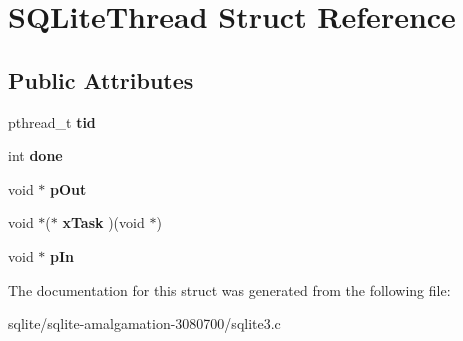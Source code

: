 \hypertarget{struct_s_q_lite_thread}{\section{S\+Q\+Lite\+Thread Struct Reference}
\label{struct_s_q_lite_thread}
}
\subsection*{Public Attributes}
\begin{DoxyCompactItemize}
\item 
\hypertarget{struct_s_q_lite_thread_a344b7b30ad7f54c6cbfb4d2378982610}{pthread\+\_\+t {\bfseries tid}}\label{struct_s_q_lite_thread_a344b7b30ad7f54c6cbfb4d2378982610}

\item 
\hypertarget{struct_s_q_lite_thread_af13ecbf8ad23f24a5074277cdcf0383b}{int {\bfseries done}}\label{struct_s_q_lite_thread_af13ecbf8ad23f24a5074277cdcf0383b}

\item 
\hypertarget{struct_s_q_lite_thread_aca6d94405a6e7eefb230cd08bf1ce71b}{void $\ast$ {\bfseries p\+Out}}\label{struct_s_q_lite_thread_aca6d94405a6e7eefb230cd08bf1ce71b}

\item 
\hypertarget{struct_s_q_lite_thread_a873c874d4c242aa217fe88b58bedca96}{void $\ast$($\ast$ {\bfseries x\+Task} )(void $\ast$)}\label{struct_s_q_lite_thread_a873c874d4c242aa217fe88b58bedca96}

\item 
\hypertarget{struct_s_q_lite_thread_ad14ce51f32c66b80c515ec2338f6ccd2}{void $\ast$ {\bfseries p\+In}}\label{struct_s_q_lite_thread_ad14ce51f32c66b80c515ec2338f6ccd2}

\end{DoxyCompactItemize}


The documentation for this struct was generated from the following file\+:\begin{DoxyCompactItemize}
\item 
sqlite/sqlite-\/amalgamation-\/3080700/sqlite3.\+c\end{DoxyCompactItemize}
